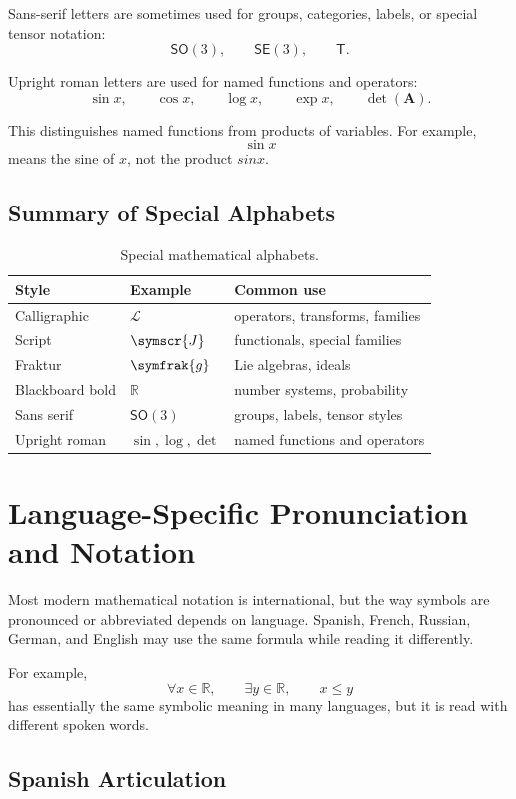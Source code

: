 \documentclass[11pt,twocolumn]{article}
\newcommand{\R}{\mathbb{R}}
\newcommand{\mat}[1]{\symbf{#1}}     %
\begin{document}
Sans-serif letters are sometimes used for groups, categories, labels, or
special tensor notation:
\[
\mathsf{SO}(3),
\qquad
\mathsf{SE}(3),
\qquad
\mathsf{T}.
\]

Upright roman letters are used for named functions and operators:
\[
\sin x,
\qquad
\cos x,
\qquad
\log x,
\qquad
\exp x,
\qquad
\det(\mat{A}).
\]

This distinguishes named functions from products of variables. For example,
\[
\sin x
\]
means the sine of \(x\), not the product \(s i n x\).

\subsection{Summary of Special Alphabets}

\begin{table}[ht]
\centering
\caption{Special mathematical alphabets.}
\begin{tabular}{lll}
\toprule
Style & Example & Common use \\
\midrule
Calligraphic & $\mathcal{L}$ & operators, transforms, families \\
Script & $\symscr{J}$ & functionals, special families \\
Fraktur & $\symfrak{g}$ & Lie algebras, ideals \\
Blackboard bold & $\mathbb{R}$ & number systems, probability \\
Sans serif & $\mathsf{SO}(3)$ & groups, labels, tensor styles \\
Upright roman & $\sin,\log,\det$ & named functions and operators \\
\bottomrule
\end{tabular}
\end{table}

\section{Language-Specific Pronunciation and Notation}

Most modern mathematical notation is international, but the way symbols are
pronounced or abbreviated depends on language. Spanish, French, Russian,
German, and English may use the same formula while reading it differently.

For example,
\[
\forall x \in \R,
\qquad
\exists y \in \R,
\qquad
x \le y
\]
has essentially the same symbolic meaning in many languages, but it is read
with different spoken words.

\subsection{Spanish Articulation}
\end{document}
